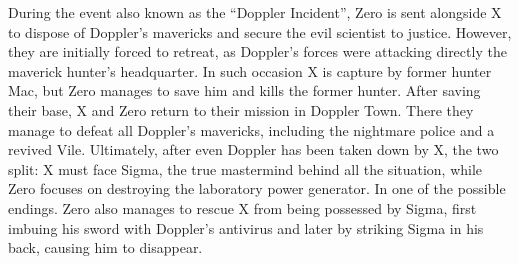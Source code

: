 During the event also known as the ``Doppler Incident'', Zero is sent alongside X to dispose of Doppler's mavericks and secure the evil scientist to justice. However, they are initially forced to retreat, as Doppler's forces were attacking directly the maverick hunter's headquarter. In such occasion X is capture by former hunter Mac, but Zero manages to save him and kills the former hunter. After saving their base, X and Zero return to their mission in Doppler Town. There they manage to defeat all Doppler's mavericks, including the nightmare police and a revived Vile. Ultimately, after even Doppler has been taken down by X, the two split: X must face Sigma, the true mastermind behind all the situation, while Zero focuses on destroying the laboratory power generator. In one of the possible endings. Zero also manages to rescue X from being possessed by Sigma, first imbuing his sword with Doppler's antivirus and later by striking Sigma in his back, causing him to disappear.